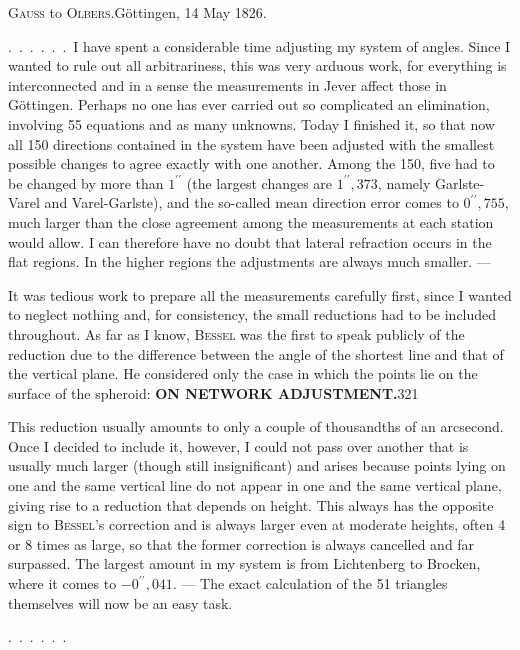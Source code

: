 \begin{center}\textsc{Gauss} to \textsc{Olbers}.\quad Göttingen, 14 May 1826.\end{center}

.\ .\ .\ .\ .\ .\ I have spent a considerable time adjusting my system
of angles. Since I wanted to rule out all arbitrariness, this was very arduous
work, for everything is interconnected and in a sense the measurements in
Jever affect those in Göttingen. Perhaps no one has ever carried out so
complicated an elimination, involving 55 equations and as many unknowns.
Today I finished it, so that now all 150 directions contained in the system
have been adjusted with the smallest possible changes to agree exactly with
one another. Among the 150, five had to be changed by more than $1^{\prime\prime}$
(the largest changes are $1^{\prime\prime}{,}373$, namely Garlste-Varel and
Varel-Garlste), and the so-called mean direction error comes to
$0^{\prime\prime}{,}755$, much larger than the close agreement among the
measurements at each station would allow. I can therefore have no doubt
that lateral refraction occurs in the flat regions. In the higher regions
the adjustments are always much smaller. ---

It was tedious work to prepare all the measurements carefully first,
since I wanted to neglect nothing and, for consistency, the small reductions
had to be included throughout. As far as I know, \textsc{Bessel} was the first
to speak publicly of the reduction due to the difference between the angle
of the shortest line and that of the vertical plane. He considered only the case in which the points
lie on the surface of the spheroid:
\clearpage
\noindent\textbf{ON NETWORK ADJUSTMENT.}\hfill321\par\medskip
\noindent This reduction usually amounts to only a couple of thousandths of
an arcsecond. Once I decided to include it, however, I could not pass over another
that is usually much larger (though still insignificant) and arises because
points lying on one and the same vertical line do not appear in one and the same
vertical plane, giving rise to a reduction that depends on height. This always
has the opposite sign to \textsc{Bessel}'s correction and is always larger even
at moderate heights, often 4 or 8 times as large, so that the former correction
is always cancelled and far surpassed. The largest amount in my system is
from Lichtenberg to Brocken, where it comes to $-0^{\prime\prime}{,}041$. --- The
exact calculation of the 51 triangles themselves will now be an easy task.
\par\medskip
.\ .\ .\ .\ .\ .

